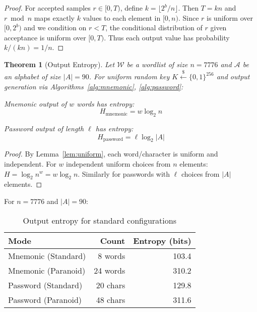 \documentclass[11pt]{article}
\newtheorem{theorem}{Theorem}
\begin{document}
\begin{proof}
For accepted samples $r \in [0, T)$, define $k = \lfloor 2^b / n \rfloor$. Then $T = kn$ and $r \bmod n$ maps exactly $k$ values to each element in $[0, n)$. Since $r$ is uniform over $[0, 2^b)$ and we condition on $r < T$, the conditional distribution of $r$ given acceptance is uniform over $[0, T)$. Thus each output value has probability $k / (kn) = 1/n$.
\end{proof}

\begin{theorem}[Output Entropy]
\label{thm:entropy}
Let $\mathcal{W}$ be a wordlist of size $n = 7776$ and $\mathcal{A}$ be an alphabet of size $|A| = 90$. For uniform random key $K \xleftarrow{\$} \{0,1\}^{256}$ and output generation via Algorithms~\ref{alg:mnemonic}, \ref{alg:password}:

Mnemonic output of $w$ words has entropy:
\begin{equation}
H_{\text{mnemonic}} = w \log_2 n
\end{equation}

Password output of length $\ell$ has entropy:
\begin{equation}
H_{\text{password}} = \ell \log_2 |A|
\end{equation}
\end{theorem}

\begin{proof}
By Lemma~\ref{lem:uniform}, each word/character is uniform and independent. For $w$ independent uniform choices from $n$ elements: $H = \log_2 n^w = w \log_2 n$. Similarly for passwords with $\ell$ choices from $|A|$ elements.
\end{proof}

For $n = 7776$ and $|A| = 90$:

\begin{table}[H]
\centering
\begin{tabular}{@{}lrr@{}}
\toprule
\textbf{Mode} & \textbf{Count} & \textbf{Entropy (bits)} \\
\midrule
Mnemonic (Standard) & 8 words & 103.4 \\
Mnemonic (Paranoid) & 24 words & 310.2 \\
Password (Standard) & 20 chars & 129.8 \\
Password (Paranoid) & 48 chars & 311.6 \\
\bottomrule
\end{tabular}
\caption{Output entropy for standard configurations}
\label{tab:entropy}
\end{table}
\end{document}
